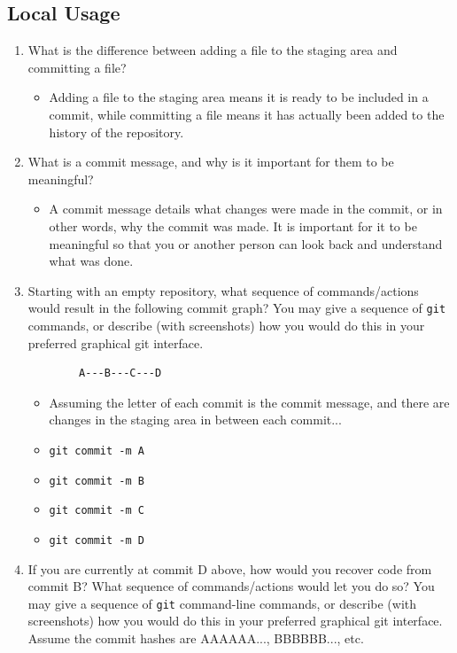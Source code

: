 \documentclass[10pt,twocolumn]{article}
\begin{document}
\subsection{Local Usage}

\begin{enumerate}
    \item What is the difference between adding a file to the staging area and committing a file?
        \begin{itemize}
            \item Adding a file to the staging area means it is ready to be included in a commit, while committing a file means it has actually been added to the history of the repository.
        \end{itemize}
    \item What is a commit message, and why is it important for them to be meaningful?
        \begin{itemize}
            \item A commit message details what changes were made in the commit, or in other words, why the commit was made. It is important for it to be meaningful so that you or another person can look back and understand what was done.
        \end{itemize}
    \item Starting with an empty repository, what sequence of commands/actions would result in the following commit graph? You may give a sequence of \texttt{git} commands, or describe (with screenshots) how you would do this in your preferred graphical git interface.
        \begin{verbatim}
        A---B---C---D
        \end{verbatim}
        \begin{itemize}
            \item Assuming the letter of each commit is the commit message, and there are changes in the staging area in between each commit...
            \item \texttt{git commit -m A}
            \item \texttt{git commit -m B}
            \item \texttt{git commit -m C}
            \item \texttt{git commit -m D}
        \end{itemize}
    \item If you are currently at commit D above, how would you recover code from commit B? What sequence of commands/actions would let you do so? You may give a sequence of \texttt{git} command-line commands, or describe (with screenshots) how you would do this in your preferred graphical git interface. Assume the commit hashes are AAAAAA..., BBBBBB..., etc.

\end{enumerate}
\end{document}
